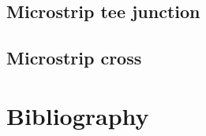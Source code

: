 \documentclass[10pt]{report}
\begin{document}
\section{Microstrip tee junction}

\section{Microstrip cross}


\chapter*{Bibliography}
\def\chapter*{}%
\def\section*{}%
\renewcommand{\bibname}{}



\nocite{*}
\end{document}
